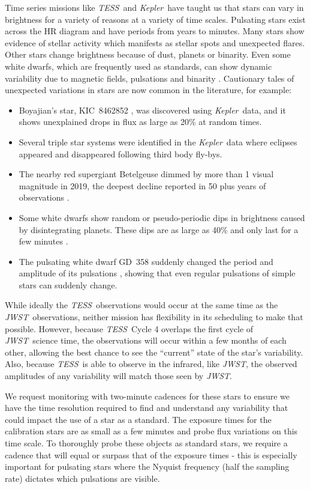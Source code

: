 \documentclass[letterpaper,12pt]{article}
\newcommand{\tess}{{\it TESS}}
\newcommand{\jwst}{{\it JWST}}
\newcommand{\kepler}{{\it Kepler}}
\begin{document}
Time series missions like \tess\ and \kepler\ have taught us that stars can vary in brightness for a variety of reasons at a variety of time scales. Pulsating stars exist across the HR diagram and have periods from years to minutes. Many stars show evidence of stellar activity which manifests as stellar spots and unexpected flares. Other stars change brightness because of dust, planets or binarity.  Even some white dwarfs, which are frequently used as standards, can show dynamic variability due to magnetic fields, pulsations and binarity \citep{Hermes2017}. Cautionary tales of unexpected variations in stars are now common in the literature, for example: 
\begin{itemize}
    \item  Boyajian's star, KIC~8462852 \citep{Boyajian2016}, was discovered using \kepler\ data, and it shows unexplained drops in flux as large as 20\% at random times.
    \item Several triple star systems were identified in the \kepler\ data \citep{Orosz2015} where eclipses appeared and disappeared following third body fly-bys. 
    \item The nearby red supergiant Betelgeuse \citep{Guinan2019} dimmed by more than 1 visual magnitude in 2019, the deepest decline reported in 50 plus years of observations \citep{Levesque2020ApJ}.
    \item Some white dwarfs show random or pseudo-periodic dips in brightness caused by disintegrating planets. These dips are as large as 40\% and only last for a few minutes \citep{Vanderburg2015}.
    \item The pulsating white dwarf GD~358 suddenly changed the period and amplitude of its pulsations \citep{Montgomery2010}, showing that even regular pulsations of simple stars can suddenly change.
\end{itemize}

While ideally the \tess\ observations would occur at the same time as the \jwst\ observations, neither mission has flexibility in its scheduling to make that possible.  However, because \tess\ Cycle 4 overlaps the first cycle of \jwst\ science time, the observations will occur within a few months of each other, allowing the best chance to see the ``current'' state of the star's variability. Also, because \tess\ is able to observe in the infrared, like \jwst, the observed amplitudes of any variability will match those seen by \jwst.

We request monitoring with two-minute cadences for these stars to ensure we have the time resolution required to find and understand any variability that could impact the use of a star as a standard. The exposure times for the calibration stars are as small as a few minutes and probe flux variations on this time scale. To thoroughly probe these objects as standard stars, we require a cadence that will equal or surpass that of the exposure times - this is especially important for pulsating stars where the Nyquist frequency (half the sampling rate) dictates which pulsations are visible.
\end{document}
